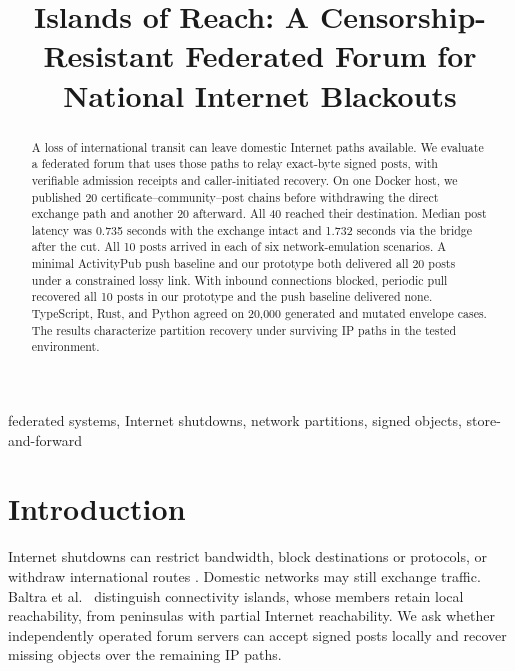 \documentclass[conference,a4paper,10pt]{IEEEtran}
\begin{document}
\title{Islands of Reach: A Censorship-Resistant Federated Forum for
National Internet Blackouts}

\author{%
}

\maketitle
\thispagestyle{iccitfirstpage}

\begin{abstract}
A loss of international transit can leave domestic Internet paths available. We evaluate a federated forum that uses those paths to relay exact-byte signed posts, with verifiable admission receipts and caller-initiated recovery. On one Docker host, we published 20 certificate--community--post chains before withdrawing the direct exchange path and another 20 afterward. All 40 reached their destination. Median post latency was 0.735 seconds with the exchange intact and 1.732 seconds via the bridge after the cut. All 10 posts arrived in each of six network-emulation scenarios. A minimal ActivityPub push baseline and our prototype both delivered all 20 posts under a constrained lossy link. With inbound connections blocked, periodic pull recovered all 10 posts in our prototype and the push baseline delivered none. TypeScript, Rust, and Python agreed on 20,000 generated and mutated envelope cases. The results characterize partition recovery under surviving IP paths in the tested environment.
\end{abstract}

\begin{IEEEkeywords}
federated systems, Internet shutdowns, network partitions, signed objects, store-and-forward
\end{IEEEkeywords}

\section{Introduction}

Internet shutdowns can restrict bandwidth, block destinations or protocols, or withdraw international routes \cite{ooni2025bangladesh,bischof2023shutdowns}. Domestic networks may still exchange traffic. Baltra et al.~\cite{baltra2024connectivity} distinguish connectivity islands, whose members retain local reachability, from peninsulas with partial Internet reachability. We ask whether independently operated forum servers can accept signed posts locally and recover missing objects over the remaining IP paths.
\end{document}
